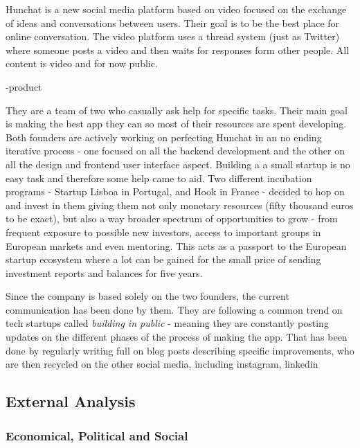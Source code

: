 \documentclass[12pt]{article}
\begin{document}
Hunchat is a new social media platform based on video focused on the exchange of ideas and conversations between users. Their goal is to be the best place for online conversation. The video platform uses a thread system (just as Twitter) where someone posts a video and then waits for responses form other people. All content is video and for now public.

-product

They are a team of two who casually ask help for specific tasks. Their main goal is making the best app they can so most of their resources are spent developing. Both founders are actively working on perfecting Hunchat in an no ending iterative process - one focused on all the backend development and the other on all the design and frontend user interface aspect. Building a a small startup is no easy task and therefore some help came to aid. Two different incubation programs - Startup Lisboa in Portugal, and Hook in France - decided to hop on and invest in them giving them not only monetary resources (fifty thousand euros to be exact), but also a way broader spectrum of opportunities to grow - from frequent exposure to possible new investors, access to important groups in European markets and even mentoring. This acts as a passport to the European startup ecosystem where a lot can be gained for the small price of sending investment reports and balances for five years.

Since the company is based solely on the two founders, the current communication has been done by them. They are following a common trend on tech startups called \textit{building in public} - meaning they are constantly posting updates on the different phases of the process of making the app. That has been done by regularly writing full on blog posts describing specific improvements, who are then recycled on the other social media, including instagram, linkedin
 


\subsection{External Analysis}
	\subsubsection{Economical, Political and Social}
\end{document}
